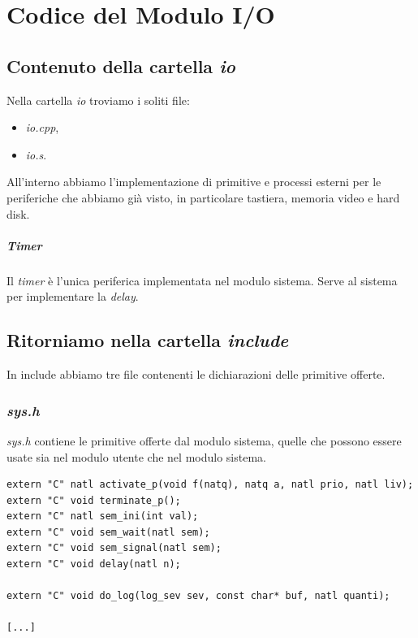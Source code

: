 \documentclass[11pt]{report}
\theoremstyle{definition}
\begin{document}
\chapter{Codice del Modulo I/O}
\section{Contenuto della cartella \emph{io}}
Nella cartella \emph{io} troviamo i soliti file:
\begin{itemize}
	\item \emph{io.cpp},
	\item \emph{io.s}.
\end{itemize}
All'interno abbiamo l'implementazione di primitive e processi esterni per le periferiche che abbiamo già visto, in particolare tastiera, memoria video e hard disk. 
\paragraph{Timer} Il \emph{timer} è l'unica periferica implementata nel modulo sistema. Serve al sistema per implementare la \emph{delay}.
\section{Ritorniamo nella cartella \emph{include}}
In include abbiamo tre file contenenti le dichiarazioni delle primitive offerte. \subsection{\emph{sys.h}}
\emph{sys.h} contiene le primitive offerte dal modulo sistema, quelle che possono essere usate sia nel modulo utente che nel modulo sistema.
\small
\begin{verbatim}
extern "C" natl activate_p(void f(natq), natq a, natl prio, natl liv);
extern "C" void terminate_p();
extern "C" natl sem_ini(int val);
extern "C" void sem_wait(natl sem);
extern "C" void sem_signal(natl sem);
extern "C" void delay(natl n);

extern "C" void do_log(log_sev sev, const char* buf, natl quanti);

[...]
\end{verbatim}
\normalsize
\end{document}
